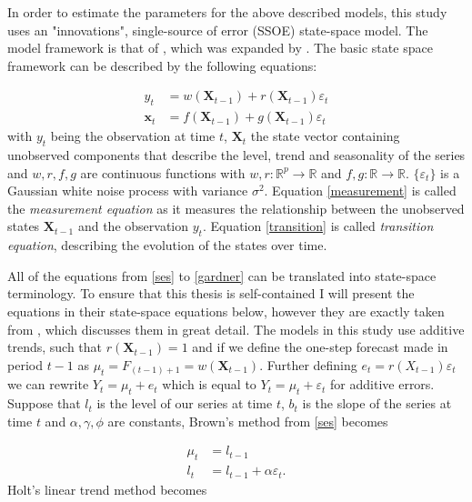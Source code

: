 In order to estimate the parameters for the above described models, this study uses an "innovations", single-source of error (SSOE) state-space model. The model framework is that of \citet{ord1997estimation}, which was expanded by \citet{hyndman2002state}. The basic state space framework can be described by the following equations:

\begin{subequations}
	\begin{align}
		y_{t}&=w\left(\boldsymbol{X}_{t-1}\right)+r\left(\boldsymbol{X}_{t-1}\right) \varepsilon_{t} \label{measurement} \\
		\boldsymbol{x}_{t}&=f\left(\boldsymbol{X}_{t-1}\right)+g\left(\boldsymbol{X}_{t-1}\right) \varepsilon_{t} \label{transition}	
	\end{align}
\end{subequations}
%
with $y_t$ being the observation at time $t$, $\boldsymbol{X}_t$ the state vector containing unobserved components that describe the level, trend and seasonality of the series and $w,r,f,g$ are continuous functions with $w,r: \mathbb{R}^p \rightarrow \mathbb{R}$ and $f,g: \mathbb{R} \rightarrow \mathbb{R}$. $\{\varepsilon_{t}\}$ is a Gaussian white noise process with variance $\sigma^2$. Equation \ref{measurement} is called the \textit{measurement equation} as it measures the relationship between the unobserved states $\boldsymbol{X}_{t-1}$ and the observation $y_t$. Equation \ref{transition} is called \textit{transition equation}, describing the evolution of the states over time. 

All of the equations from \ref{ses} to \ref{gardner} can be translated into state-space terminology. To ensure that this thesis is self-contained I will present the equations in their state-space equations below, however they are exactly taken from \citet{hyndman2002state}, which discusses them in great detail. The models in this study use additive trends, such that $r(\boldsymbol{X}_{t-1}) = 1$ and if we define the one-step forecast made in period $t-1$ as $\mu_t = F_{(t-1)+1} = w\left(\boldsymbol{X}_{t-1}\right)$. Further defining $e_{t}=r\left(X_{t-1}\right) \varepsilon_{t}$ we can rewrite $Y_t = \mu_t + e_t$ which is equal to $Y_t = \mu_t + \varepsilon_t$ for additive errors. Suppose that $l_t$ is the level of our series at time $t$, $b_t$ is the slope of the series at time $t$ and $\alpha, \gamma, \phi$ are constants, Brown's method from \ref{ses} becomes

\begin{equation}
	\begin{array}{rl}
		\mu_{t}&=l_{t-1} \\
		l_{t}&=l_{t-1}+\alpha \varepsilon_{t}.
	\end{array}
\end{equation}
%
Holt's linear trend method becomes

